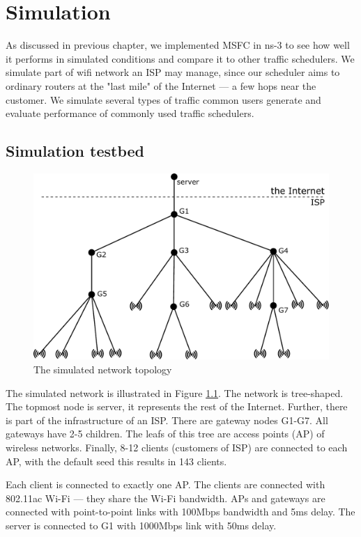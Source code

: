 \chapter{Simulation}
\label{chap:sidh}
As discussed in previous chapter, we implemented MSFC in ns-3 to see how well it performs in simulated conditions and compare it to other traffic schedulers. We simulate part of wifi network an ISP may manage, since our scheduler aims to ordinary routers at the "last mile" of the Internet --- a few hops near the customer. We simulate several types of traffic common users generate and evaluate performance of commonly used traffic schedulers. 

\section{Simulation testbed}

\begin{figure}
	\centering
	\includegraphics[width=137mm]{drawings/layout}
	\caption{The simulated network topology}
	\label{fig11:sim_layout}
\end{figure}


The simulated network is illustrated in Figure \ref{fig11:sim_layout}. The network is tree-shaped. The topmost node is server, it represents the rest of the Internet. Further, there is part of the infrastructure of an ISP. There are gateway nodes G1-G7. All gateways have 2-5 children. The leafs of this tree are access points (AP) of wireless networks. Finally, 8-12 clients (customers of ISP) are connected to each AP, with the default seed this results in 143 clients. 

Each client is connected to exactly one AP. The clients are connected with 802.11ac Wi-Fi --- they share the Wi-Fi bandwidth. APs and gateways are connected with point-to-point links with 100Mbps bandwidth and 5ms delay. The server is connected to G1 with 1000Mbps link with 50ms delay.

